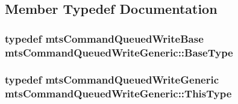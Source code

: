 \subsection{Member Typedef Documentation}
\hypertarget{classmts_command_queued_write_generic_aed493b67ec1386ed63d4cfa04c7d8990}{
\subsubsection[{Base\-Type}]{\setlength{\rightskip}{0pt plus 5cm}typedef {\bf mts\-Command\-Queued\-Write\-Base} {\bf mts\-Command\-Queued\-Write\-Generic\-::\-Base\-Type}\hspace{0.3cm}{\ttfamily [protected]}}}\label{classmts_command_queued_write_generic_aed493b67ec1386ed63d4cfa04c7d8990}
\hypertarget{classmts_command_queued_write_generic_a7f9494fd611be623fa3e51a3e12052d6}{
\subsubsection[{This\-Type}]{\setlength{\rightskip}{0pt plus 5cm}typedef {\bf mts\-Command\-Queued\-Write\-Generic} {\bf mts\-Command\-Queued\-Write\-Generic\-::\-This\-Type}\hspace{0.3cm}{\ttfamily [protected]}}}\label{classmts_command_queued_write_generic_a7f9494fd611be623fa3e51a3e12052d6}


